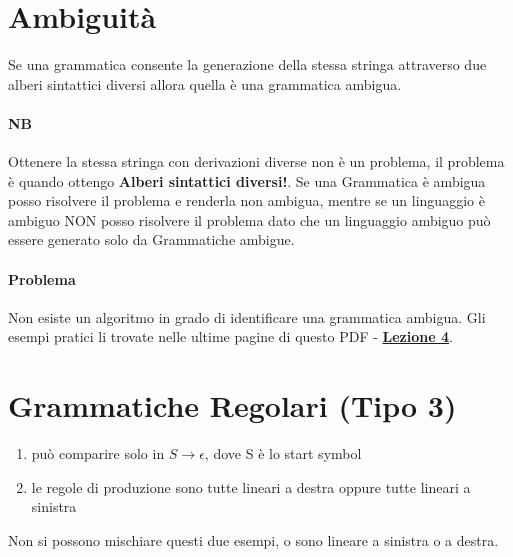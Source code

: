 \section*{Ambiguità}
Se una grammatica consente la generazione della stessa stringa attraverso due alberi sintattici
diversi allora quella è una grammatica ambigua.
\paragraph*{NB} Ottenere la stessa stringa con derivazioni diverse non è un problema,
il problema è quando ottengo \textbf{Alberi sintattici diversi!}.
Se una Grammatica è ambigua posso risolvere il problema e renderla non ambigua, mentre
se un linguaggio è ambiguo NON posso risolvere il problema dato che
un linguaggio ambiguo può essere generato solo da Grammatiche ambigue.
\paragraph*{Problema} Non esiste un algoritmo in grado di identificare una grammatica
ambigua. Gli esempi pratici li trovate nelle ultime pagine di questo PDF - 
{\href{https://drive.google.com/drive/folders/1gdH43dnEfCeLGmq08HEBwQoKORGgcQdY}{\textbf{Lezione 4}}}.
\section{Grammatiche Regolari (Tipo 3)}
\begin{enumerate}
    \item \eps può comparire solo in $S \rightarrow \epsilon$, dove S è lo start symbol
    \item le regole di produzione sono tutte lineari a destra oppure tutte lineari a sinistra
\end{enumerate}
Non si possono mischiare questi due esempi, o sono lineare a sinistra o a destra.
